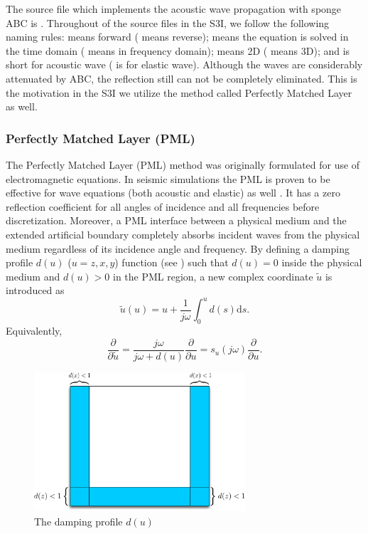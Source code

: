 \documentclass[11pt,titlepage]{article}
\theoremstyle{plain}
\theoremstyle{definition}
\theoremstyle{remark}
\numberwithin{equation}{section}
\begin{document}
The source file which implements the acoustic wave propagation with sponge ABC 
is . Throughout of the source files in the S3I,  we follow the following naming rules:  means forward ( means reverse);  means the equation is solved in the time domain ( means in frequency domain);  means 2D ( means 3D); and  is short
 for acoustic wave ( is for elastic wave).  Although the waves are considerably attenuated by ABC, the reflection still can not be completely eliminated. This is the motivation in the S3I we utilize the method called Perfectly Matched Layer as well. 



\subsubsection{Perfectly Matched Layer (PML)}
The Perfectly Matched Layer (PML) method was originally formulated for use of electromagnetic equations. In seismic simulations the PML is proven to be effective for wave equations (both acoustic and elastic) as well \cite{Komatitsch:2007aa}. It has a zero reflection coefficient for all angles of incidence and all frequencies before discretization. Moreover, a PML interface between a physical medium and the extended artificial boundary completely absorbs incident waves from the physical medium regardless of its incidence angle and frequency.
By defining a damping profile $d(u)$ ($u=z, x, y$) function (see ) such that $d(u) = 0$ inside the physical medium and $d(u) > 0$ in the PML region, a new complex coordinate $\tilde{u}$ is introduced as
  \begin{equation}
  \label{eq:replace}
  \tilde{u}(u) = u + \frac{1}{j\omega}\int_0^u d(s)\mathrm{d}s.
  \end{equation}
Equivalently,
  \begin{equation}
  \frac{\partial}{\partial \tilde{u}} = \frac{j\omega}{j\omega + d(u)}\frac{\partial}{\partial u} = s_u(j\omega)\frac{\partial}{\partial u}.
  \end{equation} 
  
\begin{figure}[htbp]
\centering
\includegraphics[width=0.7\textwidth]{Fig/SpongeABC.pdf}
\caption{The damping profile $d(u)$}
\end{figure}
\end{document}

